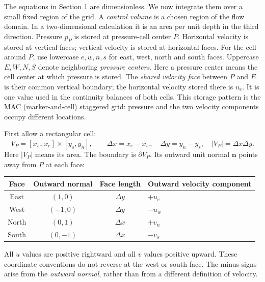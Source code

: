 
\newpage
{}
The equations in Section 1 are dimensionless. We now integrate them over a
small fixed region of the grid. A \emph{control volume} is a chosen region of the flow domain. In a
two-dimensional calculation it is an area per unit depth in the third direction.
Pressure $p_P$ is stored at pressure-cell center $P$. Horizontal velocity is
stored at vertical faces; vertical velocity is stored at horizontal faces.
For the cell around $P$, use lowercase $e,w,n,s$ for east, west, north and south
faces. Uppercase $E,W,N,S$ denote neighboring \emph{pressure centers}.
Here a pressure center means the cell center at which pressure is stored.
The \emph{shared velocity face} between $P$ and $E$ is their common vertical
boundary; the horizontal velocity stored there is $u_e$. It is one value used
in the continuity balances of both cells. This storage pattern is the MAC (marker-and-cell)
staggered grid: pressure and the two velocity components occupy different locations.

\newpage
{}
First allow a rectangular cell:
\[
V_P=[x_w,x_e]\times[y_s,y_n],\qquad
\Delta x=x_e-x_w,\quad\Delta y=y_n-y_s,\quad |V_P|=\Delta x\Delta y.
\]
Here $|V_P|$ means its area. The boundary is $\partial V_P$. Its outward unit
normal $\boldsymbol n$ points away from $P$ at each face:
\begin{center}\begin{tabular}{cccl}\toprule
Face & Outward normal & Face length & Outward velocity component\\\midrule
East & $(1,0)$ & $\Delta y$ & $+u_e$\\
West & $(-1,0)$ & $\Delta y$ & $-u_w$\\
North & $(0,1)$ & $\Delta x$ & $+v_n$\\
South & $(0,-1)$ & $\Delta x$ & $-v_s$\\\bottomrule
\end{tabular}\end{center}
All $u$ values are positive rightward and all $v$ values positive upward.
These coordinate conventions do not reverse at the west or south face.
The minus signs arise from the \emph{outward normal}, rather than from a
different definition of velocity.

